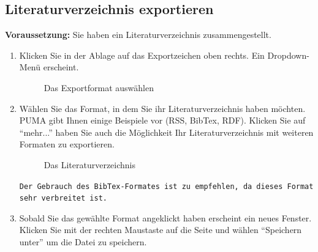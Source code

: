 \subsection{Literaturverzeichnis exportieren}
\textbf{Voraussetzung:} Sie haben ein Literaturverzeichnis zusammengestellt.
\begin{enumerate}
    \item Klicken Sie in der Ablage auf das Exportzeichen oben rechts. Ein Dropdown-Menü erscheint.
\begin{figure}[h!]
 \centering
 \caption{Das Exportformat auswählen}
 \label{figure040}
\end{figure}
    \item Wählen Sie das Format, in dem Sie ihr Literaturverzeichnis haben möchten. PUMA gibt Ihnen einige Beispiele vor (RSS, BibTex, RDF). Klicken Sie auf \enquote{mehr...} haben Sie auch die Möglichkeit Ihr Literaturverzeichnis mit weiteren Formaten zu exportieren. 
\begin{figure}[h!]
 \centering
 \caption{Das Literaturverzeichnis}
 \label{figure041}
\end{figure}
\begin{mdframed}[style=mdfexample1,frametitle={\texttt{TIPP}},backgroundcolor=gray!40] \texttt{Der Gebrauch des BibTex-Formates ist zu empfehlen, da dieses Format sehr verbreitet ist.}
\end{mdframed}
    \item Sobald Sie das gewählte Format angeklickt haben erscheint ein neues Fenster. Klicken Sie mit der rechten Maustaste auf die Seite und wählen \enquote{Speichern unter} um die Datei zu speichern.
\end{enumerate}
